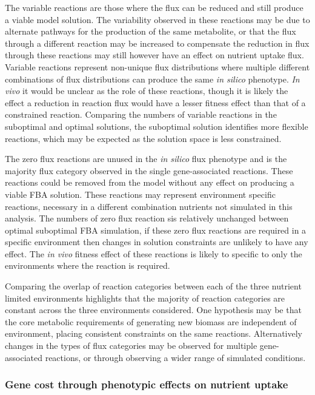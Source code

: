 The variable reactions are those where the flux can be reduced and still produce a viable model solution. The variability observed in these reactions may be due to alternate pathways for the production of the same metabolite, or that the flux through a different reaction may be increased to compensate the reduction in flux through these reactions may still however have an effect on nutrient uptake flux. Variable reactions represent non-unique flux distributions where multiple different combinations of flux distributions can produce the same \emph{in silico} phenotype. \emph{In vivo} it would be unclear as the role of these reactions, though it is likely the effect a reduction in reaction flux would have a lesser fitness effect than that of a constrained reaction. Comparing the numbers of variable reactions in the suboptimal and optimal solutions, the suboptimal solution identifies more flexible reactions, which may be expected as the solution space is less constrained.

The zero flux reactions are unused in the \emph{in silico} flux phenotype and is the majority flux category observed in the single gene-associated reactions. These reactions could be removed from the model without any effect on producing a viable FBA solution. These reactions may represent environment specific reactions, necessary in a different combination nutrients not simulated in this analysis. The numbers of zero flux reaction sis relatively unchanged between optimal suboptimal FBA simulation, if these zero flux reactions are required in a specific environment then changes in solution constraints are unlikely to have any effect. The \emph{in vivo} fitness effect of these reactions is likely to specific to only the environments where the reaction is required.

Comparing the overlap of reaction categories between each of the three nutrient limited environments highlights that the majority of reaction categories are constant across the three environments considered. One hypothesis may be that the core metabolic requirements of generating new biomass are independent of environment, placing consistent constraints on the same reactions. Alternatively changes in the types of flux categories may be observed for multiple gene-associated reactions, or through observing a wider range of simulated conditions.

\subsubsection{Gene cost through phenotypic effects on nutrient uptake}%

